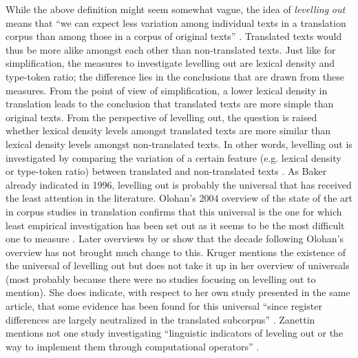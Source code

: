 While the above definition might seem somewhat vague, the idea of \textit{levelling} \textit{out} means that “we can expect less variation among individual texts in a translation corpus than among those in a corpus of original texts”  \citep[177]{Baker1996}. Translated texts would thus be more alike amongst each other than non-translated texts. Just like for simplification, the measures to investigate levelling out are lexical density and type-token ratio; the difference lies in the conclusions that are drawn from these measures. From the point of view of simplification, a lower lexical density in translation leads to the conclusion that translated texts are more simple than original texts. From the perspective of levelling out, the question is raised whether lexical density levels amongst translated texts are more similar than lexical density levels amongst non-translated texts. In other words, levelling out is investigated by comparing the variation of a certain feature (e.g. lexical density or type-token ratio) between translated and non-translated texts  \citep[184]{Baker1996}. As Baker already indicated in 1996, levelling out is probably the universal that has received the least attention in the literature. Olohan’s 2004 overview of the state of the art in corpus studies in translation confirms that this universal is the one for which least empirical investigation has been set out as it seems to be the most difficult one to measure \citep[100]{Olohan2004}. Later overviews by \citet{Kruger2012} or \citet{zanettin_corpus_2013} show that the decade following Olohan’s overview has not brought much change to this. Kruger mentions the existence of the universal of levelling out but does not take it up in her overview of universals (most probably because there were no studies focusing on levelling out to mention). She does indicate, with respect to her own study presented in the same article, that some evidence has been found for this universal “since register differences are largely neutralized in the translated subcorpus” \citep[369]{kruger_corpus-based_2012}. Zanettin mentions not one study investigating “linguistic indicators of leveling out or the way to implement them through computational operators” \citep[23]{zanettin_corpus_2013}.




